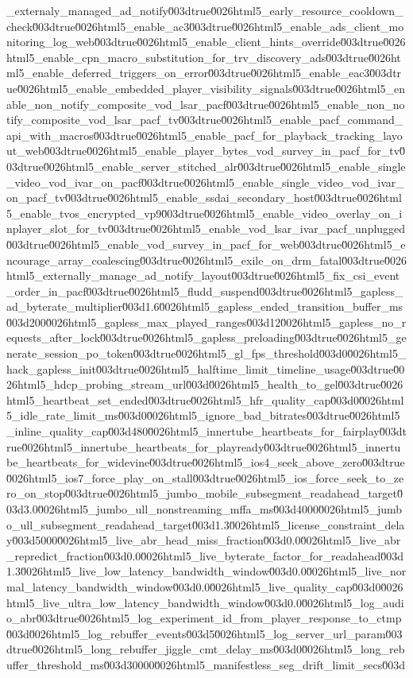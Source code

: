 {_externaly_managed_ad_notify\u003dtrue\u0026html5_early_resource_cooldown_check\u003dtrue\u0026html5_enable_ac3\u003dtrue\u0026html5_enable_ads_client_monitoring_log_web\u003dtrue\u0026html5_enable_client_hints_override\u003dtrue\u0026html5_enable_cpn_macro_substitution_for_trv_discovery_ads\u003dtrue\u0026html5_enable_deferred_triggers_on_error\u003dtrue\u0026html5_enable_eac3\u003dtrue\u0026html5_enable_embedded_player_visibility_signals\u003dtrue\u0026html5_enable_non_notify_composite_vod_lsar_pacf\u003dtrue\u0026html5_enable_non_notify_composite_vod_lsar_pacf_tv\u003dtrue\u0026html5_enable_pacf_command_api_with_macros\u003dtrue\u0026html5_enable_pacf_for_playback_tracking_layout_web\u003dtrue\u0026html5_enable_player_bytes_vod_survey_in_pacf_for_tv\u003dtrue\u0026html5_enable_server_stitched_alr\u003dtrue\u0026html5_enable_single_video_vod_ivar_on_pacf\u003dtrue\u0026html5_enable_single_video_vod_ivar_on_pacf_tv\u003dtrue\u0026html5_enable_ssdai_secondary_host\u003dtrue\u0026html5_enable_tvos_encrypted_vp9\u003dtrue\u0026html5_enable_video_overlay_on_inplayer_slot_for_tv\u003dtrue\u0026html5_enable_vod_lsar_ivar_pacf_unplugged\u003dtrue\u0026html5_enable_vod_survey_in_pacf_for_web\u003dtrue\u0026html5_encourage_array_coalescing\u003dtrue\u0026html5_exile_on_drm_fatal\u003dtrue\u0026html5_externally_manage_ad_notify_layout\u003dtrue\u0026html5_fix_csi_event_order_in_pacf\u003dtrue\u0026html5_fludd_suspend\u003dtrue\u0026html5_gapless_ad_byterate_multiplier\u003d1.6\u0026html5_gapless_ended_transition_buffer_ms\u003d200\u0026html5_gapless_max_played_ranges\u003d12\u0026html5_gapless_no_requests_after_lock\u003dtrue\u0026html5_gapless_preloading\u003dtrue\u0026html5_generate_session_po_token\u003dtrue\u0026html5_gl_fps_threshold\u003d0\u0026html5_hack_gapless_init\u003dtrue\u0026html5_halftime_limit_timeline_usage\u003dtrue\u0026html5_hdcp_probing_stream_url\u003d\u0026html5_health_to_gel\u003dtrue\u0026html5_heartbeat_set_ended\u003dtrue\u0026html5_hfr_quality_cap\u003d0\u0026html5_idle_rate_limit_ms\u003d0\u0026html5_ignore_bad_bitrates\u003dtrue\u0026html5_inline_quality_cap\u003d480\u0026html5_innertube_heartbeats_for_fairplay\u003dtrue\u0026html5_innertube_heartbeats_for_playready\u003dtrue\u0026html5_innertube_heartbeats_for_widevine\u003dtrue\u0026html5_ios4_seek_above_zero\u003dtrue\u0026html5_ios7_force_play_on_stall\u003dtrue\u0026html5_ios_force_seek_to_zero_on_stop\u003dtrue\u0026html5_jumbo_mobile_subsegment_readahead_target\u003d3.0\u0026html5_jumbo_ull_nonstreaming_mffa_ms\u003d4000\u0026html5_jumbo_ull_subsegment_readahead_target\u003d1.3\u0026html5_license_constraint_delay\u003d5000\u0026html5_live_abr_head_miss_fraction\u003d0.0\u0026html5_live_abr_repredict_fraction\u003d0.0\u0026html5_live_byterate_factor_for_readahead\u003d1.3\u0026html5_live_low_latency_bandwidth_window\u003d0.0\u0026html5_live_normal_latency_bandwidth_window\u003d0.0\u0026html5_live_quality_cap\u003d0\u0026html5_live_ultra_low_latency_bandwidth_window\u003d0.0\u0026html5_log_audio_abr\u003dtrue\u0026html5_log_experiment_id_from_player_response_to_ctmp\u003d\u0026html5_log_rebuffer_events\u003d5\u0026html5_log_server_url_param\u003dtrue\u0026html5_long_rebuffer_jiggle_cmt_delay_ms\u003d0\u0026html5_long_rebuffer_threshold_ms\u003d30000\u0026html5_manifestless_seg_drift_limit_secs\u003d}

